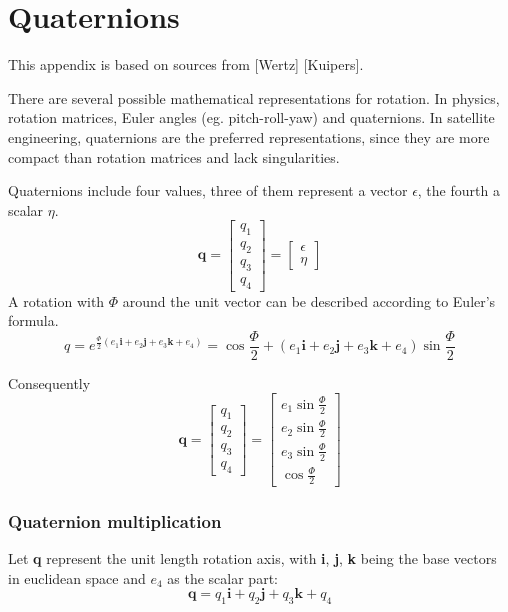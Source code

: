 \chapter{Quaternions } \label{chap:B}
This appendix is based on sources from [Wertz] [Kuipers].

There are several possible mathematical representations for rotation. In physics, rotation matrices, Euler angles (eg. pitch-roll-yaw) and quaternions. In satellite engineering, quaternions are the preferred representations, since they are more compact than rotation matrices and lack singularities.

Quaternions include four values, three of them represent a vector \textbf{$\epsilon$}, the fourth a scalar $\eta$. 
\begin{equation}
\textbf{q} =
\left[ 
\begin{array}{cccc}
q_1 \\
q_2 \\  
q_3 \\
q_4 
\end{array}
\right] 
= 
\left[ 
\begin{array}{cccc}
\textbf{$\epsilon$} \\
\eta
\end{array}
\right] 
\end{equation}
A rotation with $\Phi$ around the unit vector can be described according to Euler's formula.
\begin{equation}
q = e^{\frac{\Phi}{2} (e_1 \textbf{i}+ e_2 \textbf{j} + e_3 \textbf{k} + e_4)} = \cos \frac{\Phi}{2} + (e_1 \textbf{i}+ e_2 \textbf{j} + e_3 \textbf{k} +e_4) \sin \frac{\Phi}{2}
\end{equation}

Consequently 
\begin{equation}
\textbf{q} =
\left[ 
\begin{array}{cccc}
q_1 \\
q_2 \\  
q_3 \\
q_4 
\end{array}
\right] 
= 
\left[ 
\begin{array}{cccc}
e_1  \sin \frac{\Phi}{2} \\
e_2  \sin \frac{\Phi}{2} \\  
e_3  \sin \frac{\Phi}{2} \\
\cos \frac{\Phi}{2} 
\end{array}
\right] 
\end{equation}

\subsection{Quaternion multiplication}
Let \textbf{q} represent the unit length rotation axis, with \textbf{i}, \textbf{j}, \textbf{k} being the base vectors in euclidean space and $e_4$ as the scalar part: 
\begin{equation}
\textbf{q} = q_1 \textbf{i}  + q_2 \textbf{j} + q_3 \textbf{k} + q_4
\end{equation}

